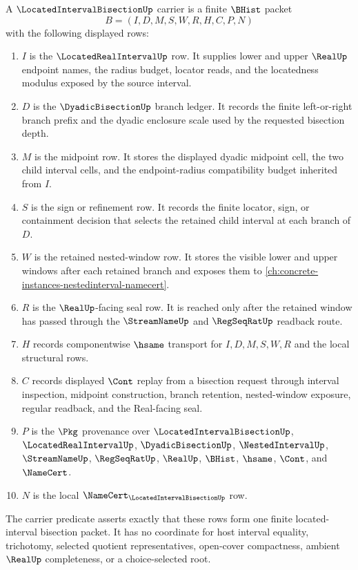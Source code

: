 \begin{definition}
\label{def:located-interval-bisection-carrier}
A $\LocatedIntervalBisectionUp$ carrier is a finite $\BHist$ packet
$$
B=(I,D,M,S,W,R,H,C,P,N)
$$
with the following displayed rows:
\begin{enumerate}
\item $I$ is the $\LocatedRealIntervalUp$ row. It supplies lower and upper $\RealUp$ endpoint names, the radius budget, locator reads, and the locatedness modulus exposed by the source interval.
\item $D$ is the $\DyadicBisectionUp$ branch ledger. It records the finite left-or-right branch prefix and the dyadic enclosure scale used by the requested bisection depth.
\item $M$ is the midpoint row. It stores the displayed dyadic midpoint cell, the two child interval cells, and the endpoint-radius compatibility budget inherited from $I$.
\item $S$ is the sign or refinement row. It records the finite locator, sign, or containment decision that selects the retained child interval at each branch of $D$.
\item $W$ is the retained nested-window row. It stores the visible lower and upper windows after each retained branch and exposes them to \autoref{ch:concrete-instances-nestedinterval-namecert}.
\item $R$ is the $\RealUp$-facing seal row. It is reached only after the retained window has passed through the $\StreamNameUp$ and $\RegSeqRatUp$ readback route.
\item $H$ records componentwise $\hsame$ transport for $I,D,M,S,W,R$ and the local structural rows.
\item $C$ records displayed $\Cont$ replay from a bisection request through interval inspection, midpoint construction, branch retention, nested-window exposure, regular readback, and the Real-facing seal.
\item $P$ is the $\Pkg$ provenance over $\LocatedIntervalBisectionUp$, $\LocatedRealIntervalUp$, $\DyadicBisectionUp$, $\NestedIntervalUp$, $\StreamNameUp$, $\RegSeqRatUp$, $\RealUp$, $\BHist$, $\hsame$, $\Cont$, and $\NameCert$.
\item $N$ is the local $\NameCert_{\LocatedIntervalBisectionUp}$ row.
\end{enumerate}
The carrier predicate asserts exactly that these rows form one finite located-interval bisection packet. It has no coordinate for host interval equality, trichotomy, selected quotient representatives, open-cover compactness, ambient $\RealUp$ completeness, or a choice-selected root.
\end{definition}

